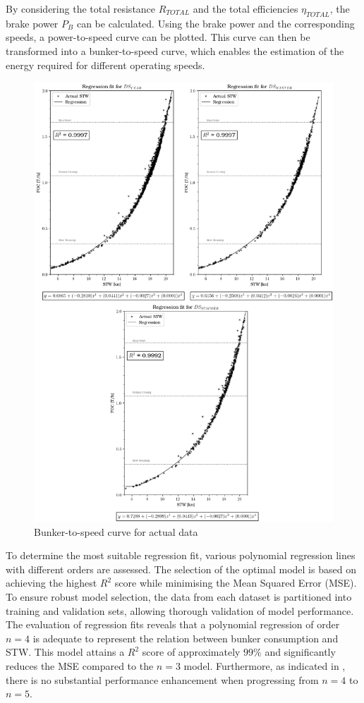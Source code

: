 By considering the total resistance $R_{TOTAL}$ and the total efficiencies $\eta_{TOTAL}$, the brake power $P_B$ can be calculated. Using the brake power and the corresponding speeds, a power-to-speed curve can be plotted. This curve can then be transformed into a bunker-to-speed curve, which enables the estimation of the energy required for different operating speeds.\\ 

\begin{figure}[h!]
    \centering
    \includegraphics[width=.9\linewidth]{02_figures/poly_act_combi.png}
    \caption{Bunker-to-speed curve for actual data}
    \label{fig:FOC_plot_act_combi}
\end{figure}

To determine the most suitable regression fit, various polynomial regression lines with different orders are assessed. The selection of the optimal model is based on achieving the highest $R^2$ score while minimising the Mean Squared Error (MSE). To ensure robust model selection, the data from each dataset is partitioned into training and validation sets, allowing thorough validation of model performance. The evaluation of regression fits reveals that a polynomial regression of order $n=4$ is adequate to represent the relation between bunker consumption and STW. This model attains a $R^2$ score of approximately $99\%$ and significantly reduces the MSE compared to the $n=3$ model. Furthermore, as indicated in , there is no substantial performance enhancement when progressing from $n=4$ to $n=5$.\\

